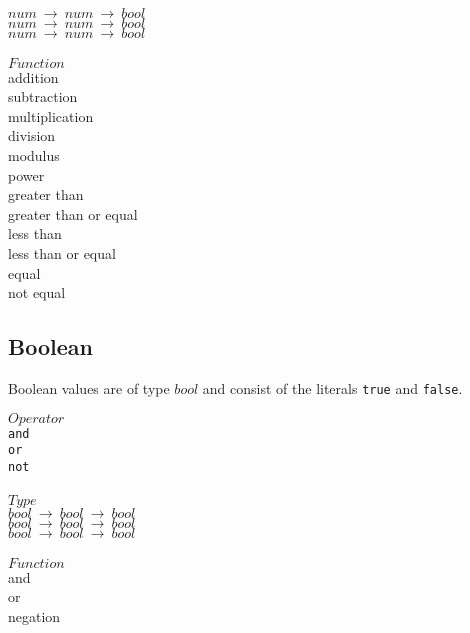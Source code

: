 \documentclass[5pt]{article}
\begin{document}
\begin{multicols}{3}
$num \ \rightarrow \ num \ \rightarrow \ bool $ \\
$num \ \rightarrow \ num \ \rightarrow \ bool $ \\
$num \ \rightarrow \ num \ \rightarrow \ bool $ \\
\columnbreak \\
$Function$ \\
addition \\
subtraction \\
multiplication \\
division \\
modulus \\
power \\
greater than \\
greater than or equal \\
less than \\
less than or equal \\
equal \\
not equal \\
\end{multicols}
\subsection{Boolean}
Boolean values are of type $bool$ and consist of the literals \texttt{true} and \texttt{false}. 
\begin{multicols}{3}
\noindent $Operator$ \\
\hspace*{5mm} \texttt{and} \\
\hspace*{5mm} \texttt{or} \\
\hspace*{5mm} \texttt{not} \\
\columnbreak \\
\noindent $Type$ \\
$bool \ \rightarrow \ bool \ \rightarrow \ bool $ \\
$bool \ \rightarrow \ bool \ \rightarrow \ bool $ \\
$bool \ \rightarrow \ bool \ \rightarrow \ bool $ \\
\columnbreak \\
\noindent $Function$ \\
and \\
or \\
negation \\
\end{multicols}
\end{document}

